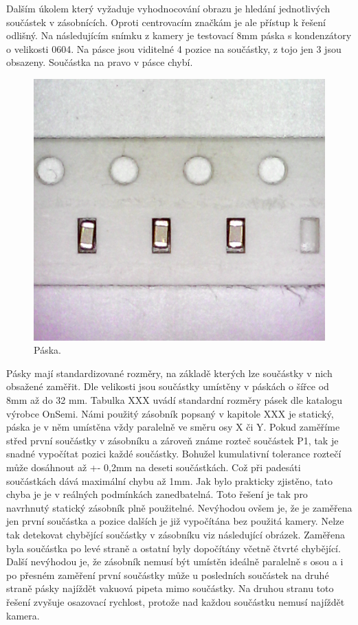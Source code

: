 Dalším úkolem který vyžaduje vyhodnocování obrazu je hledání jednotlivých součástek v zásobnících. Oproti centrovacím značkám je ale přístup k řešení odlišný. Na následujícím snímku z kamery je testovací 8mm páska s kondenzátory o velikosti 0604. Na pásce jsou viditelné 4 pozice na součástky, z tojo jen 3 jsou obsazeny. Součástka na pravo v pásce chybí.

\begin{figure}[h!]
  \centering
    \includegraphics[width=0.5\linewidth]{obrazky/tape3.png}%
    \caption{Páska.}
    \label{fig:tape}
\end{figure}


Pásky mají standardizované rozměry, na základě kterých lze součástky v nich obsažené zaměřit. Dle velikosti jsou součástky umístěny v páskách o šířce od 8mm až do 32 mm. Tabulka XXX uvádí standardní rozměry pásek dle katalogu výrobce OnSemi. 
Námi použitý zásobník popsaný v kapitole XXX je statický, páska je v něm umístěna vždy paralelně ve směru osy X či Y. Pokud zaměříme střed první součástky v zásobníku a zároveň známe rozteč součástek P1, tak je snadné vypočítat pozici každé součástky. Bohužel kumulativní tolerance roztečí může dosáhnout až +- 0,2mm na deseti součástkách. Což při padesáti součástkách dává maximální chybu až 1mm. Jak bylo prakticky zjistěno, tato chyba je je v reálných podmínkách zanedbatelná. Toto řešení je tak pro navrhnutý statický zásobník plně použitelné. Nevýhodou ovšem je, že je zaměřena jen první součástka a pozice dalších je již vypočítána bez použitá kamery.  Nelze tak detekovat chybějící součástky v zásobníku viz následující obrázek. Zaměřena byla součástka po levé straně a ostatní byly dopočítány včetně čtvrté chybějící. Další nevýhodou je, že zásobník nemusí být umístěn ideálně paralelně s osou a i po přesném zaměření první součástky může u posledních součástek na druhé straně pásky najíždět vakuová pipeta mimo součástky. Na druhou stranu toto řešení zvyšuje osazovací rychlost, protože nad každou součástku nemusí najíždět kamera.

